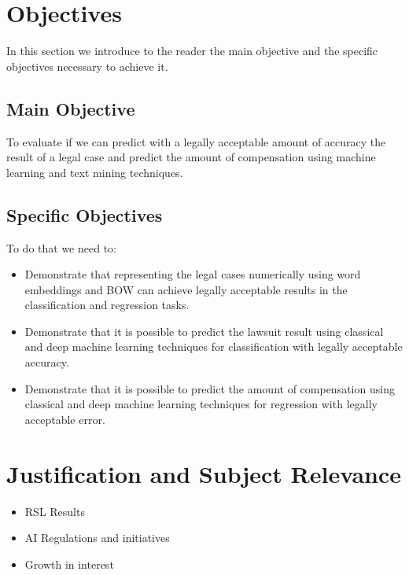 \section{Objectives}

In this section we introduce to the reader the main objective and the specific objectives necessary to achieve it.

\subsection{Main Objective}

To evaluate if we can predict with a legally acceptable amount of accuracy the result of a legal case and predict the amount of compensation using machine learning and text mining techniques.

\subsection{Specific Objectives}

To do that we need to:

\begin{itemize}[noitemsep]
    \item Demonstrate that representing the legal cases numerically using word embeddings and BOW can achieve legally acceptable results in the classification and regression tasks.
    \item Demonstrate that it is possible to predict the lawsuit result using classical and deep machine learning techniques for classification with legally acceptable accuracy.
    \item Demonstrate that it is possible to predict the amount of compensation  using classical and deep machine learning  techniques for regression with legally acceptable error.
\end{itemize}

\section{Justification and Subject Relevance}
\begin{itemize}[noitemsep]
    \item RSL Results
    \item AI Regulations and initiatives
    \item Growth in interest 
\end{itemize}

